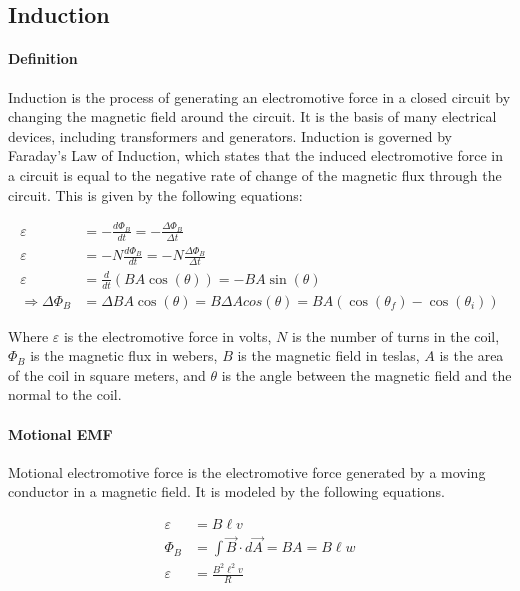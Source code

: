 \subsection{Induction}
\hrulefill

\paragraph*{Definition}
Induction is the process of generating an electromotive force in a closed circuit by changing the magnetic field around the circuit.
It is the basis of many electrical devices, including transformers and generators. Induction is governed by Faraday's Law of Induction,
which states that the induced electromotive force in a circuit is equal to the negative rate of change of the magnetic flux through 
the circuit. This is given by the following equations:

\begin{align*}
    \varepsilon &= -\frac{d\Phi_B}{dt} = -\frac{\Delta \Phi_B}{\Delta t}\\
    \varepsilon &= -N\frac{d\Phi_B}{dt} = -N\frac{\Delta \Phi_B}{\Delta t}\\
    \varepsilon &= \frac{d}{dt}(BA\cos(\theta)) = -BA\sin(\theta)\\
    \Rightarrow \Delta \Phi_B &= \Delta BA\cos(\theta) = B\Delta Acos(\theta) = BA(\cos(\theta_f) - \cos(\theta_i))
\end{align*}

Where $\varepsilon$ is the electromotive force in volts, $N$ is the number of turns in the coil, $\Phi_B$ is the magnetic flux in webers, $B$ is the magnetic field in teslas, $A$ is the area of the coil in square meters, and $\theta$ is the angle between the magnetic field and the normal to the coil.\\

\paragraph*{Motional EMF}
Motional electromotive force is the electromotive force generated by a moving conductor in a magnetic field. It is modeled by the following equations.

\begin{align*}
    \varepsilon &= B\ell v\\
    \Phi_B &= \int \vec{B} \cdot d\vec{A} = BA = B\ell w\\
    \varepsilon &= \frac{B^2\ell^2v}{R}
\end{align*}

